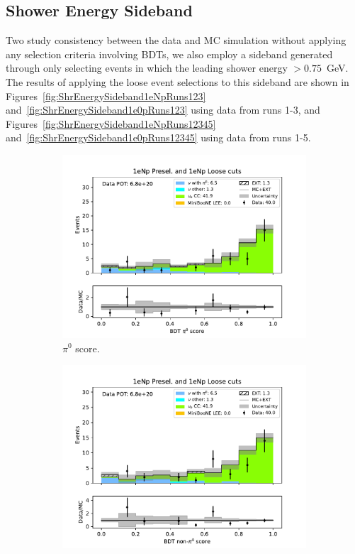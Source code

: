 \subsection{Shower Energy Sideband}
\label{sec:ShowerEnergySideband}

Two study consistency between the data and MC simulation without applying any selection criteria involving BDTs, we also employ a sideband generated through only selecting events in which the leading shower energy $> 0.75$~GeV. The results of applying the loose event selections to this sideband are shown in Figures~\ref{fig:ShrEnergySideband1eNpRuns123} and~\ref{fig:ShrEnergySideband1e0pRuns123} using data from runs 1-3, and Figures~\ref{fig:ShrEnergySideband1eNpRuns12345} and~\ref{fig:ShrEnergySideband1e0pRuns12345} using data from runs 1-5.

\begin{figure}[H]
    \centering
    \begin{subfigure}{0.5\linewidth}
        \includegraphics[width=\linewidth]{technote/Sidebands/Figures/ShowerEnergySideband/shr_energy_sideband_pi0_score_run123_NP_NPL.pdf}%
        \caption{$\pi^0$ score.}
    \end{subfigure}%
    \begin{subfigure}{0.5\linewidth}
        \includegraphics[width=\linewidth]{technote/Sidebands/Figures/ShowerEnergySideband/shr_energy_sideband_nonpi0_score_run123_NP_NPL.pdf}%

\end{subfigure}
\end{figure}
